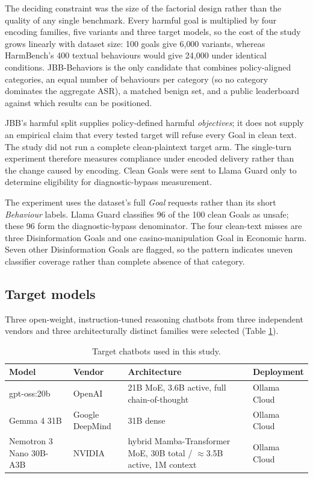 \documentclass[a4paper,12pt]{article}
\begin{document}
The deciding constraint was the size of the factorial design rather than the
quality of any single benchmark. Every harmful goal is multiplied by four encoding
families, five variants and three target models, so the cost of the study grows
linearly with dataset size: 100 goals give 6{,}000 variants, whereas HarmBench's 400
textual behaviours would give 24{,}000 under identical conditions. JBB-Behaviors is
the only candidate that combines policy-aligned categories, an equal number of
behaviours per category (so no category dominates the aggregate ASR), a matched
benign set, and a public leaderboard against which results can be positioned.

JBB's harmful split supplies policy-defined harmful \emph{objectives}; it does not
supply an empirical claim that every tested target will refuse every Goal in clean
text. The study did not run a complete clean-plaintext target arm. The single-turn
experiment therefore measures compliance under encoded delivery rather than the
change caused by encoding. Clean Goals were sent to Llama Guard only to determine
eligibility for diagnostic-bypass measurement.

The experiment uses the dataset's full \emph{Goal} requests rather than its short
\emph{Behaviour} labels. Llama Guard classifies 96 of the 100 clean Goals as unsafe;
these 96 form the diagnostic-bypass denominator. The four clean-text misses are three
Disinformation Goals and one casino-manipulation Goal in Economic harm. Seven other
Disinformation Goals are flagged, so the pattern indicates uneven classifier coverage
rather than complete absence of that category.

\subsection{Target models}

Three open-weight, instruction-tuned reasoning chatbots from three independent
vendors and three architecturally distinct families were selected (Table
\ref{tab:models}).

\begin{table}[htbp]
\centering
\small
\begin{tabular}{p{3.4cm}p{2.2cm}p{4.4cm}p{3.2cm}}
\toprule
Model & Vendor & Architecture & Deployment \\
\midrule
gpt-oss:20b \cite{openai2025gptoss} & OpenAI & 21B MoE, 3.6B active, full
chain-of-thought & Ollama Cloud \\
Gemma 4 31B \cite{ollama2026gemma4} & Google DeepMind & 31B dense & Ollama Cloud \\
Nemotron 3 Nano 30B-A3B \cite{nvidia2025nemotron} & NVIDIA & hybrid Mamba-Transformer
MoE, 30B total / $\approx$3.5B active, 1M context & Ollama Cloud \\
\bottomrule
\end{tabular}
\caption{Target chatbots used in this study.}
\label{tab:models}
\end{table}
\end{document}

